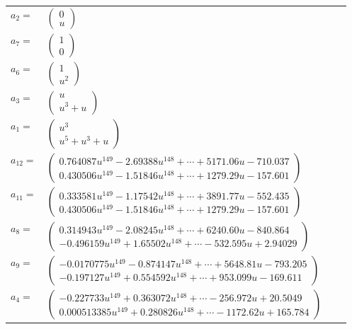 \documentclass[1p]{elsarticle_modified}
\theoremstyle{definition}
\begin{document}
\begin{tabular}{m{7pt} m{180pt} m{7pt} m{180pt} }
\flushright $a_{2}=$&$\begin{pmatrix}0\\u\end{pmatrix}$ \\
\flushright $a_{7}=$&$\begin{pmatrix}1\\0\end{pmatrix}$ \\
\flushright $a_{6}=$&$\begin{pmatrix}1\\u^2\end{pmatrix}$ \\
\flushright $a_{3}=$&$\begin{pmatrix}u\\u^3+u\end{pmatrix}$ \\
\flushright $a_{1}=$&$\begin{pmatrix}u^3\\u^5+u^3+u\end{pmatrix}$ \\
\flushright $a_{12}=$&$\begin{pmatrix}0.764087 u^{149}-2.69388 u^{148}+\cdots+5171.06 u-710.037\\0.430506 u^{149}-1.51846 u^{148}+\cdots+1279.29 u-157.601\end{pmatrix}$ \\
\flushright $a_{11}=$&$\begin{pmatrix}0.333581 u^{149}-1.17542 u^{148}+\cdots+3891.77 u-552.435\\0.430506 u^{149}-1.51846 u^{148}+\cdots+1279.29 u-157.601\end{pmatrix}$ \\
\flushright $a_{8}=$&$\begin{pmatrix}0.314943 u^{149}-2.08245 u^{148}+\cdots+6240.60 u-840.864\\-0.496159 u^{149}+1.65502 u^{148}+\cdots-532.595 u+2.94029\end{pmatrix}$ \\
\flushright $a_{9}=$&$\begin{pmatrix}-0.0170775 u^{149}-0.874147 u^{148}+\cdots+5648.81 u-793.205\\-0.197127 u^{149}+0.554592 u^{148}+\cdots+953.099 u-169.611\end{pmatrix}$ \\
\flushright $a_{4}=$&$\begin{pmatrix}-0.227733 u^{149}+0.363072 u^{148}+\cdots-256.972 u+20.5049\\0.000513385 u^{149}+0.280826 u^{148}+\cdots-1172.62 u+165.784\end{pmatrix}$ \\

\end{tabular}
\end{document}
